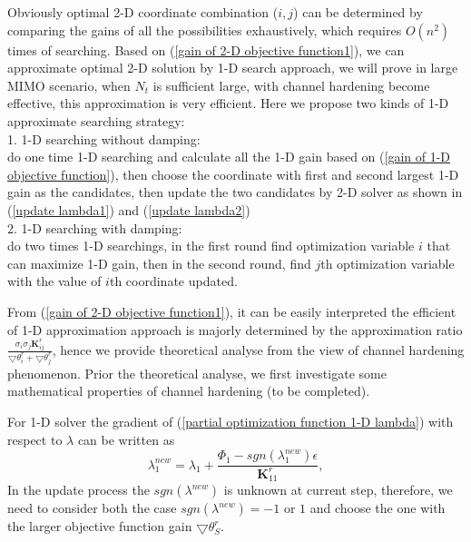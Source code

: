 \documentclass[12pt, draftclsnofoot, onecolumn]{IEEEtran}
\begin{document}
\begin{spacing}{2}
Obviously optimal 2-D coordinate combination ($i, j$) can be determined by comparing the gains of all the possibilities exhaustively, which requires $O(n^{2})$ times of searching. Based on (\ref{gain of 2-D objective function1}), we can approximate optimal 2-D solution by 1-D search approach, we will prove in large MIMO scenario, when $N_{t}$ is sufficient large, with channel hardening become effective, this approximation is very efficient. Here we propose two kinds of 1-D approximate searching strategy:\\
1. 1-D searching without damping:\\
do one time 1-D searching and calculate all the 1-D gain based on (\ref{gain of 1-D objective function}), then choose the coordinate with first and second largest 1-D gain as the candidates, then update the two candidates by 2-D solver as shown in (\ref{update lambda1}) and (\ref{update lambda2})\\
2. 1-D searching with damping:\\
do two times 1-D searchings, in the first round find optimization variable $i$ that can maximize 1-D gain, then in the second round, find $j$th optimization variable with the value of $i$th coordinate updated.

From (\ref{gain of 2-D objective function1}), it can be easily interpreted the efficient of 1-D approximation approach is majorly determined by the approximation ratio $\frac{\sigma_{i}\sigma_{j}\mathbf{K}^{r}_{ij}}{\bigtriangledown \theta^{r}_{i}+\bigtriangledown \theta^{r}_{j}}$, hence we provide theoretical analyse from the view of channel hardening phenomenon. Prior the theoretical analyse, we first investigate some mathematical properties of channel hardening (to be completed).    

For 1-D solver the gradient of (\ref{partial optimization function 1-D lambda}) with respect to $\lambda$ can be written as
\begin{equation}
\lambda_{1}^{new}=\lambda_{1}+\frac{\Phi_{1}-sgn(\lambda_{1}^{new})\epsilon}{\mathbf{K}^{r}_{11}},
\label{gradient lambda}
\end{equation}
In the update process the $sgn(\lambda^{new})$ is unknown at current step, therefore, we need to consider both the case $sgn(\lambda^{new})=-1 $ or $1$ and choose the one with the larger objective function gain $\bigtriangledown \theta^{r}_{S}$.
 





\end{spacing}
\end{document}
